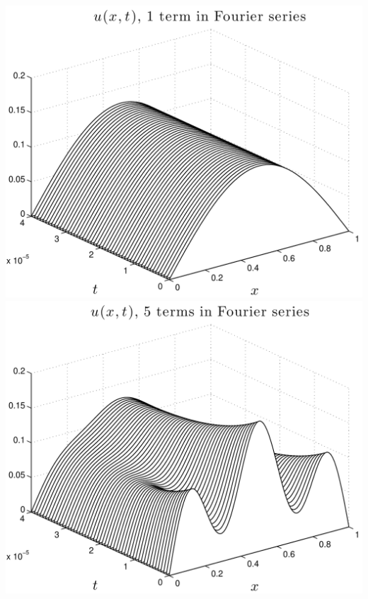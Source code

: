 {\begin{solution}
\begin{enumerate}
\hspace*{-7em}
\includegraphics[scale=0.5]{fourth_wf1}
\includegraphics[scale=0.5]{fourth_wf5}


\end{enumerate}
\end{solution}}
